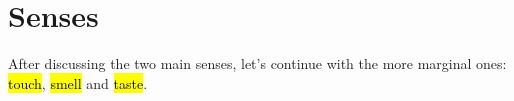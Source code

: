 \section{Senses}







\begin{paper}
	After discussing the two main senses, let’s continue with the more marginal ones: \hl{touch}, \hl{smell} and \hl{taste}.
\end{paper}









